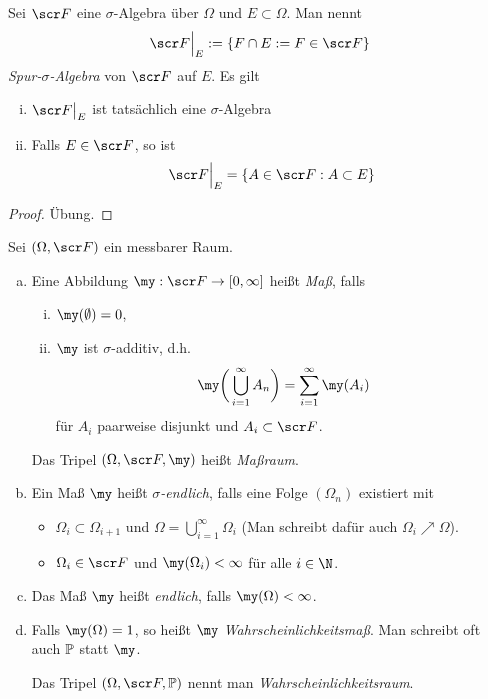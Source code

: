 \begin{nt} \label{1.1.7}
	Sei $\scr F$ eine $\sigma$-Algebra über $\Omega$ und $E \subset \Omega$.
	Man nennt
	\[
		\scr F\Big|_E := \{ F \cap E := F \in \scr F \}
	\]
	\emph{Spur-$\sigma$-Algebra} von $\scr F$ auf $E$.
	Es gilt
	\begin{enumerate}[(i)]
		\item
			$\scr F\big|_E$ ist tatsächlich eine $\sigma$-Algebra
		\item
			Falls $E \in \scr F$, so ist
			\[
				\scr F\Big|_{E} = \{ A \in \scr F : A \subset E \}
			\]
	\end{enumerate}
	\begin{proof}
		Übung.
	\end{proof}
\end{nt}

\begin{df} \label{1.1.8}
	Sei $(\Omega, \scr F)$ ein messbarer Raum.
	\begin{enumerate}[(a)]
		\item
			Eine Abbildung $\my : \scr F \to [0,\infty]$ heißt \emph{Maß}, falls
			\begin{enumerate}[(i)]
				\item
					$\my(\emptyset) = 0$,
				\item
					$\my$ ist $\sigma$-additiv, d.h.
					\[
						\my \bigg( \bigcup_{i=1}^\infty A_n \bigg)
						= \sum_{i=1}^\infty \my(A_i)
					\]
					für $A_i$ paarweise disjunkt und $A_i \subset \scr F$.
			\end{enumerate}

			Das Tripel $(\Omega, \scr F, \my)$ heißt \emph{Maßraum}.
		\item
			Ein Maß $\my$ heißt \emph{$\sigma$-endlich}, falls eine Folge $(\Omega_n)$ existiert mit
			\begin{itemize}
				\item
					$\Omega_i \subset \Omega_{i+1}$ und	$\Omega = \bigcup_{i=1}^\infty \Omega_i$
					(Man schreibt dafür auch $\Omega_i \nearrow \Omega$).
				\item
					$\Omega_i \in \scr F$ und $\my(\Omega_i) < \infty$ für alle $i \in \N$.
			\end{itemize}
		\item
			Das Maß $\my$ heißt \emph{endlich}, falls $\my(\Omega) < \infty$.
		\item
			Falls $\my(\Omega) = 1$, so heißt $\my$ \emph{Wahrscheinlichkeitsmaß}.
			Man schreibt oft auch $\P$ statt $\my$.

			Das Tripel $(\Omega, \scr F, \P)$ nennt man \emph{Wahrscheinlichkeitsraum}.
	\end{enumerate}
\end{df}

